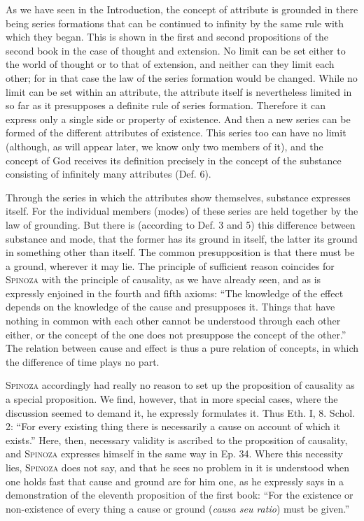 \documentclass[12pt]{article}
\newcommand{\opage}[1]{\marginnote{\footnotesize\textit{[#1]}}}
\begin{document}
As we have seen in the Introduction, the concept of attribute is grounded in there
being series formations that can be continued to infinity by the same rule with which
they began. This is shown in the first and second propositions of the second book in
the case of thought and extension. No limit can be set either to the world of
thought or to that of extension, and neither can they limit each other; for in that
case the law of the series formation would be changed. While no limit can be set
within an attribute, the attribute itself is nevertheless limited in so far as it
presupposes a definite rule of series formation. Therefore it can express only a
single side or property of existence. And then a new series can be formed of the
different attributes of existence. This series too can have no limit (although, as
will appear later, we know only two members of it), and the concept of God receives
its definition precisely in the concept of the substance consisting of infinitely
many attributes (Def. 6).

Through the series in which the attributes show themselves, substance expresses
itself. For the individual members (modes) of these series are held together by the
law of grounding. But there is (according to Def. 3 and 5) this difference between
substance and mode, that the former has its ground in itself, the latter its ground in
something other than itself. The common presupposition is that there must be a ground,
wherever it may lie. The principle of sufficient reason coincides for \textsc{Spinoza}
with the principle of causality, as we have already seen, and as is expressly
enjoined in the fourth and fifth axioms: ``The knowledge of the effect depends on the
knowledge of the cause and presupposes it. Things that have nothing in common with
each other cannot be understood through each other either, or the concept of the one
does not presuppose the concept of the other.'' The relation between cause and effect
is thus a pure relation of concepts, in which the difference of time plays no part.

\textsc{Spinoza} accordingly had really no reason to set up the proposition of
causality as a special proposition. We find, however, that in more special cases,
where the discussion seemed to demand it, he expressly formulates it. Thus Eth. I, 8.
Schol. 2: ``For every existing thing there is necessarily a cause on account of which
it exists.'' Here, then, necessary validity is ascribed to the proposition of
causality, and \textsc{Spinoza} expresses himself in the same way in Ep. 34. Where this
\opage{16}necessity lies, \textsc{Spinoza} does not say, and that he sees no problem
in it is understood when one holds fast that cause and ground are for him one, as he
expressly says in a demonstration of the eleventh proposition of the first book:
``For the existence or non-existence of every thing a cause or ground (\textit{causa
seu ratio}) must be given.''
\end{document}
